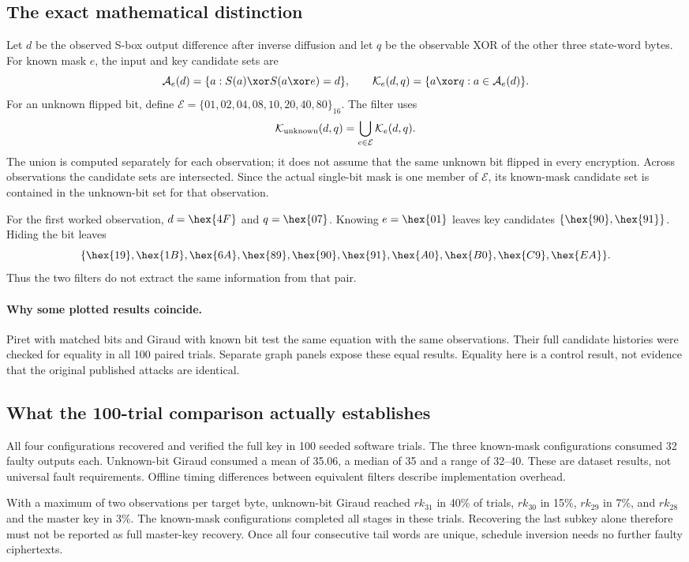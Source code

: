 \subsection{The exact mathematical distinction}
Let $d$ be the observed S-box output difference after inverse diffusion and let $q$ be the observable XOR of the other three state-word bytes. For known mask $e$, the input and key candidate sets are
\[
\mathcal A_e(d)=\{a:S(a)\xor S(a\xor e)=d\},\qquad
\mathcal K_e(d,q)=\{a\xor q:a\in\mathcal A_e(d)\}.
\]
For an unknown flipped bit, define $\mathcal E=\{01,02,04,08,10,20,40,80\}_{16}$. The filter uses
\[
\mathcal K_{\rm unknown}(d,q)=\bigcup_{e\in\mathcal E}\mathcal K_e(d,q).
\]
The union is computed separately for each observation; it does not assume that the same unknown bit flipped in every encryption. Across observations the candidate sets are intersected. Since the actual single-bit mask is one member of $\mathcal E$, its known-mask candidate set is contained in the unknown-bit set for that observation.

For the first worked observation, $d=\hex{4F}$ and $q=\hex{07}$. Knowing $e=\hex{01}$ leaves key candidates $\{\hex{90},\hex{91}\}$. Hiding the bit leaves
\[
\{\hex{19},\hex{1B},\hex{6A},\hex{89},\hex{90},\hex{91},\hex{A0},\hex{B0},\hex{C9},\hex{EA}\}.
\]
Thus the two filters do not extract the same information from that pair.

\paragraph{Why some plotted results coincide.}
Piret with matched bits and Giraud with known bit test the same equation with the same observations. Their full candidate histories were checked for equality in all 100 paired trials. Separate graph panels expose these equal results. Equality here is a control result, not evidence that the original published attacks are identical.

\subsection{What the 100-trial comparison actually establishes}
All four configurations recovered and verified the full key in 100 seeded software trials. The three known-mask configurations consumed 32 faulty outputs each. Unknown-bit Giraud consumed a mean of 35.06, a median of 35 and a range of 32--40. These are dataset results, not universal fault requirements. Offline timing differences between equivalent filters describe implementation overhead.

With a maximum of two observations per target byte, unknown-bit Giraud reached $rk_{31}$ in 40\% of trials, $rk_{30}$ in 15\%, $rk_{29}$ in 7\%, and $rk_{28}$ and the master key in 3\%. The known-mask configurations completed all stages in these trials. Recovering the last subkey alone therefore must not be reported as full master-key recovery. Once all four consecutive tail words are unique, schedule inversion needs no further faulty ciphertexts.
